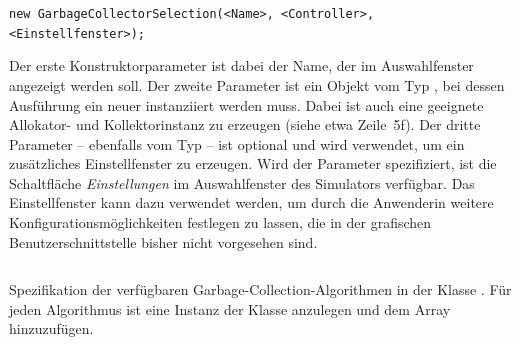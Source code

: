 \vspace*{-0.5cm}
\begin{center}
	\texttt{new GarbageCollectorSelection(<Name>, <Controller>, <Einstellfenster>);}
\end{center}

\vspace*{-0.5cm}
Der erste Konstruktorparameter ist dabei der Name, der im Auswahlfenster angezeigt werden soll.
Der zweite Parameter ist ein Objekt vom Typ , bei dessen Ausführung ein neuer  instanziiert werden muss.
Dabei ist auch eine geeignete Allokator- und Kollektorinstanz zu erzeugen (siehe etwa Zeile~5f).
Der dritte Parameter -- ebenfalls vom Typ  -- ist optional und wird verwendet, um ein zusätzliches Einstellfenster zu erzeugen.
Wird der Parameter spezifiziert, ist die Schaltfläche \textit{Einstellungen} im Auswahlfenster des Simulators verfügbar.
Das Einstellfenster kann dazu verwendet werden, um durch die Anwenderin weitere Konfigurationsmöglichkeiten festlegen zu lassen, die in der grafischen Benutzerschnittstelle bisher nicht vorgesehen sind.

\begin{listing}[h]
	\inputminted[]{java}{code/CollectorSelection.java}
	\caption[Spezifikation der verfügbaren Algorithmen]{Spezifikation der verfügbaren Garbage-Collection-Algorithmen in der Klasse . Für jeden Algorithmus ist eine Instanz der Klasse  anzulegen und dem Array  hinzuzufügen.}
	\label{java:selection}
\end{listing}